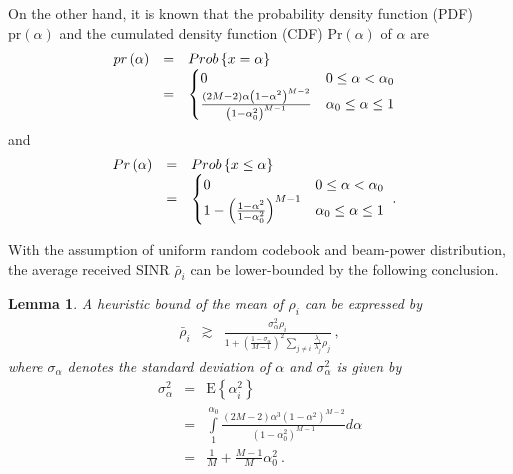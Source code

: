 \documentclass[10pt,fleqn, twocolumn]{IEEEtran}
\newtheorem{lemma}{Lemma}
\begin{document}
On the other hand, it is known that the probability density
function (PDF) $\mbox{pr}\left(\alpha\right)$ and the cumulated
density function (CDF) $\mbox{Pr}\left(\alpha\right)$ of $\alpha$
are
\begin{equation}\hspace{-0.10in}
\begin{array}{rcl}
\mbox{pr}\left(\alpha\right)&=&\mbox{Prob}\left\{x=\alpha\right\}\\
&=&\begin{cases}
0 & 0\leq \alpha < \alpha_{0} \\
\frac{\left(2M-2\right)\alpha\left(1-\alpha^2\right)^{M-2}}{\left(1-\alpha_{0}^{2}\right)^{M-1}}
& \alpha_{0}\leq\alpha\leq 1
\end{cases}
\end{array}
\end{equation}
\noindent and
\begin{equation}\hspace{-0.10in}
\begin{array}{rcl}
\mbox{Pr}\left(\alpha\right)&=&\mbox{Prob}\left\{x\leq\alpha\right\} \\
&=&
\begin{cases}
0 & 0 \leq\alpha < \alpha_{0} \\
1-\left(\frac{1-\alpha^2}{1-\alpha_{0}^2}\right)^{M-1} &
\alpha_{0}\leq\alpha\leq 1
\end{cases}\ .
\end{array}
\end{equation}

With the assumption of uniform random codebook and beam-power
distribution, the average received SINR $\bar\rho_{i}$ can be
lower-bounded by the following conclusion.
\begin{lemma} A heuristic bound of the mean of $\rho_{i}$
can be expressed by
\begin{equation}%
\begin{array}{rcl}
\bar\rho_{i}&\gtrsim& \frac{\sigma_{\alpha}^{2}\rho_{i}}{1+
\left(\frac{1-\sigma_{\alpha}}{M-1}\right)^{2}\sum\limits_{j\neq
i}\frac{\lambda_{i}}{\lambda_{j}}\rho_{j}}\ ,
\end{array}
\end{equation}
\noindent where  $\sigma_{\alpha}$ denotes the standard deviation
of $\alpha$ and $\sigma_{\alpha}^2$ is given by
\begin{equation}
\begin{array}{rcl}
\sigma_{\alpha}^2&=&\mbox{E}\left\{\alpha_{i}^2\right\}\\
&=&\int\limits_{1}^{\alpha_{0}}\frac{\left(2M-2\right)\alpha^3\left(1-\alpha^2\right)^{M-2}}{\left(1-\alpha_{0}^{2}\right)^{M-1}}d\alpha\\
&=&\frac{1}{M}+\frac{M-1}{M}\alpha_{0}^2\ .
\end{array}
\end{equation}
\end{lemma}
\end{document}
